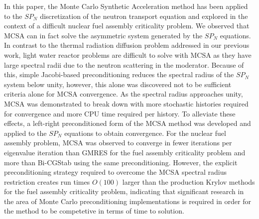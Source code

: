 \documentclass[letterpaper,11pt]{article}
\begin{document}
In this paper, the Monte Carlo Synthetic Acceleration method has been
applied to the $SP_N$ discretization of the neutron transport equation
and explored in the context of a difficult nuclear fuel assembly
criticality problem. We observed that MCSA can in fact solve the
asymmetric system generated by the $SP_N$ equations. In contrast to
the thermal radiation diffusion problem addressed in our previous
work, light water reactor problems are difficult to solve with MCSA as
they have large spectral radii due to the neutron scattering in the
moderator. Because of this, simple Jacobi-based preconditioning
reduces the spectral radius of the $SP_N$ system below unity, however,
this alone was discovered not to be sufficient criteria alone for MCSA
convergence. As the spectral radius approaches unity, MCSA was
demonstrated to break down with more stochastic histories required for
convergence and more CPU time required per history. To alleviate these
effects, a left-right preconditioned form of the MCSA method was
developed and applied to the $SP_N$ equations to obtain
convergence. For the nuclear fuel assembly problem, MCSA was observed
to converge in fewer iterations per eigenvalue iteration than GMRES
for the fuel assembly criticality problem and more than Bi-CGStab
using the same preconditioning. However, the explicit preconditioning
strategy required to overcome the MCSA spectral radius restriction
creates run times $O(100)$ larger than the production Krylov methods
for the fuel assembly criticality problem, indicating that significant
research in the area of Monte Carlo preconditioning implementations is
required in order for the method to be competetive in terms of time to
solution.

\pagebreak
 

\end{document}
